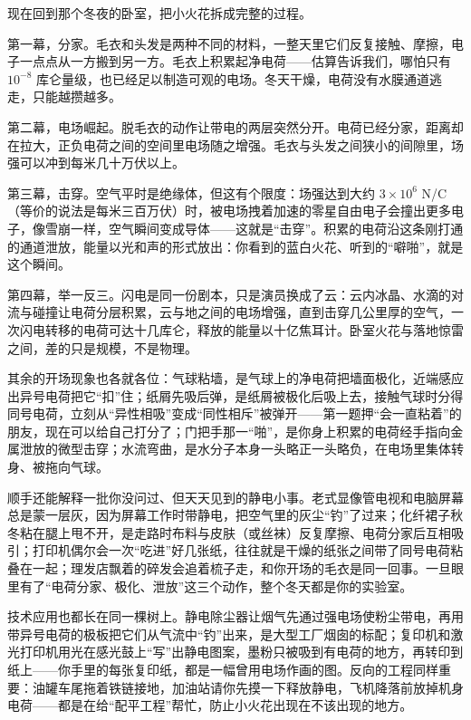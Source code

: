 
\begin{mainline}
现在回到那个冬夜的卧室，把小火花拆成完整的过程。

第一幕，分家。毛衣和头发是两种不同的材料，一整天里它们反复接触、摩擦，电子一点点从一方搬到另一方。毛衣上积累起净电荷——估算告诉我们，哪怕只有 \(10^{-8}\) 库仑量级，也已经足以制造可观的电场。冬天干燥，电荷没有水膜通道逃走，只能越攒越多。

第二幕，电场崛起。脱毛衣的动作让带电的两层突然分开。电荷已经分家，距离却在拉大，正负电荷之间的空间里电场随之增强。毛衣与头发之间狭小的间隙里，场强可以冲到每米几十万伏以上。

第三幕，击穿。空气平时是绝缘体，但这有个限度：场强达到大约 \(3\times10^{6}\) N/C（等价的说法是每米三百万伏）时，被电场拽着加速的零星自由电子会撞出更多电子，像雪崩一样，空气瞬间变成导体——这就是“击穿”。积累的电荷沿这条刚打通的通道泄放，能量以光和声的形式放出：你看到的蓝白火花、听到的“噼啪”，就是这个瞬间。

第四幕，举一反三。闪电是同一份剧本，只是演员换成了云：云内冰晶、水滴的对流与碰撞让电荷分层积累，云与地之间的电场增强，直到击穿几公里厚的空气，一次闪电转移的电荷可达十几库仑，释放的能量以十亿焦耳计。卧室火花与落地惊雷之间，差的只是规模，不是物理。

其余的开场现象也各就各位：气球粘墙，是气球上的净电荷把墙面极化，近端感应出异号电荷把它“扣”住；纸屑先吸后弹，是纸屑被极化后吸上去，接触气球时分得同号电荷，立刻从“异性相吸”变成“同性相斥”被弹开——第一题押“会一直粘着”的朋友，现在可以给自己打分了；门把手那一“啪”，是你身上积累的电荷经手指向金属泄放的微型击穿；水流弯曲，是水分子本身一头略正一头略负，在电场里集体转身、被拖向气球。

顺手还能解释一批你没问过、但天天见到的静电小事。老式显像管电视和电脑屏幕总是蒙一层灰，因为屏幕工作时带静电，把空气里的灰尘“钓”了过来；化纤裙子秋冬粘在腿上甩不开，是走路时布料与皮肤（或丝袜）反复摩擦、电荷分家后互相吸引；打印机偶尔会一次“吃进”好几张纸，往往就是干燥的纸张之间带了同号电荷粘叠在一起；理发店飘着的碎发会追着梳子走，和你开场的毛衣是同一回事。一旦眼里有了“电荷分家、极化、泄放”这三个动作，整个冬天都是你的实验室。

技术应用也都长在同一棵树上。静电除尘器让烟气先通过强电场使粉尘带电，再用带异号电荷的极板把它们从气流中“钓”出来，是大型工厂烟囱的标配；复印机和激光打印机用光在感光鼓上“写”出静电图案，墨粉只被吸到有电荷的地方，再转印到纸上——你手里的每张复印纸，都是一幅曾用电场作画的图。反向的工程同样重要：油罐车尾拖着铁链接地，加油站请你先摸一下释放静电，飞机降落前放掉机身电荷——都是在给“配平工程”帮忙，防止小火花出现在不该出现的地方。
\end{mainline}

